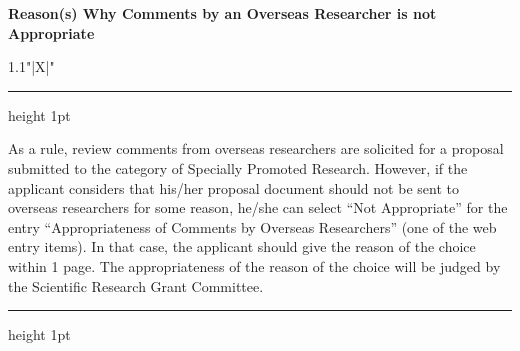 \documentclass[8pt]{extarticle}
\makeatletter
\newcommand{\thickhline}{%
	\noalign {\ifnum 0=`}\fi \hrule height 1pt
	\futurelet \reserved@a \@xhline
}
\makeatother
\begin{document}
	
\noindent\textbf{\fontsize{12}{12}\selectfont Reason(s) Why Comments by an Overseas Researcher is not Appropriate}\\
\begin{tabularx}{1.1\linewidth}{"|X|"}
	\thickhline
	As a rule, review comments from overseas researchers are solicited for a proposal submitted to the category of Specially Promoted Research. However, if the applicant considers that his/her proposal document should not be sent to overseas researchers for some reason, he/she can select ``Not Appropriate'' for the entry ``Appropriateness of Comments by Overseas Researchers'' (one of the web entry items). In that case, the applicant should give the reason of the choice within 1 page. The appropriateness of the reason of the choice will be judged by the Scientific Research Grant Committee.
	\\
	\thickhline
\end{tabularx}
\end{document}
